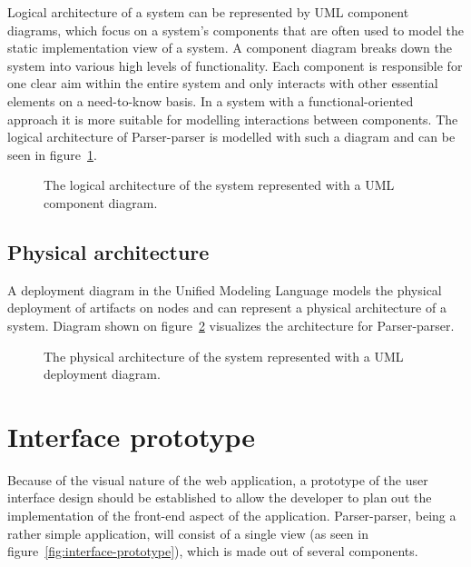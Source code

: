 \documentclass[english,engineering]{wizthesis}
\newcommand{\todo}[1]{%
  \textcolor{red}{[\textbf{TODO}\ifx&#1&{}\else{ }\fi\emph{#1}]}%
}
\newcommand{\paraphrase}[1]{#1}
\newcommand{\thisproject}{Parser-parser}
\begin{document}
Logical architecture of a system can be represented by UML component diagrams,
which focus on a system's components that are often used to model the static
implementation view of a system. \paraphrase{A component diagram breaks down the
system into various high levels of functionality. Each component is responsible
for one clear aim within the entire system and only interacts with other
essential elements on a need-to-know basis.} In a system with a
functional-oriented approach it is more suitable for modelling interactions
between components. The logical architecture of \thisproject{} is modelled with
such a diagram and can be seen in figure~\ref{fig:logical-architecture}.

\begin{figure}[H]
  \centering
  \resizebox{0.8\textwidth}{!}{\small}
  \caption{The logical architecture of the system represented with a UML
  component diagram.}
  \label{fig:logical-architecture}
\end{figure}

\subsection{Physical architecture}

A deployment diagram in the Unified Modeling Language models the physical
deployment of artifacts on nodes and can represent a physical architecture of
a system. Diagram shown on figure~\ref{fig:physical-architecture} visualizes
the architecture for \thisproject{}.

\begin{figure}[H]
  \centering
  \resizebox{\textwidth}{!}{\footnotesize}
  \caption{The physical architecture of the system represented with a UML
  deployment diagram.}
  \label{fig:physical-architecture}
\end{figure}



\section{Interface prototype} \label{sec:interface-prototype}

Because of the visual nature of the web application, a prototype of the user
interface design should be established to allow the developer to plan out the
implementation of the front-end aspect of the application. \thisproject{}, being
a rather simple application, will consist of a single view (as seen in
figure~\ref{fig:interface-prototype}), which is made out of several components.
\end{document}

